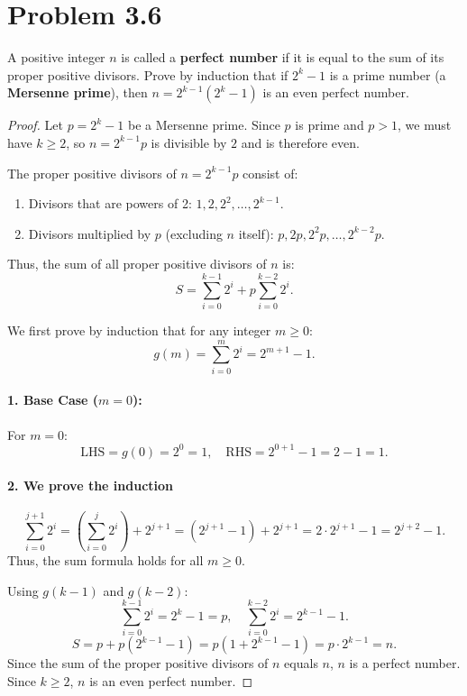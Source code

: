 \documentclass[12pt]{article}
\begin{document}
\section*{Problem 3.6}

A positive integer $n$ is called a \textbf{perfect number} if it is equal to the sum of its proper positive divisors.
Prove by induction that if $2^k - 1$ is a prime number (a \textbf{Mersenne prime}), then $n = 2^{k-1}(2^k - 1)$ is an even perfect number.

\begin{proof}
Let $p = 2^k - 1$ be a Mersenne prime. Since $p$ is prime and $p > 1$, we must have $k \ge 2$, so $n = 2^{k-1}p$ is divisible by $2$ and is therefore even.

The proper positive divisors of $n = 2^{k-1}p$ consist of:
\begin{enumerate}
    \item Divisors that are powers of 2: $1, 2, 2^2, \dots, 2^{k-1}$.
    \item Divisors multiplied by $p$ (excluding $n$ itself): $p, 2p, 2^2p, \dots, 2^{k-2}p$.
\end{enumerate}

Thus, the sum of all proper positive divisors of $n$ is:
\[
S = \sum_{i=0}^{k-1} 2^i + p \sum_{i=0}^{k-2} 2^i.
\]

We first prove by induction that for any integer $m \ge 0$:
\[
g(m) = \sum_{i=0}^{m} 2^i = 2^{m+1} - 1.
\]

\paragraph{1. Base Case ($m = 0$):}
For $m = 0$:
\[
\text{LHS} = g(0) = 2^0 = 1, \quad \text{RHS} = 2^{0+1} - 1 = 2 - 1 = 1.
\]

\paragraph{2. We prove the induction}
\[
\sum_{i=0}^{j+1} 2^i = \left(\sum_{i=0}^{j} 2^i\right) + 2^{j+1} = (2^{j+1} - 1) + 2^{j+1} = 2 \cdot 2^{j+1} - 1 = 2^{j+2} - 1.
\]
Thus, the sum formula holds for all $m \ge 0$.

Using $g(k-1)$ and $g(k-2)$:
\[
\sum_{i=0}^{k-1} 2^i = 2^k - 1 = p, \quad \sum_{i=0}^{k-2} 2^i = 2^{k-1} - 1.
\]
\[
S = p + p(2^{k-1} - 1) = p\left(1 + 2^{k-1} - 1\right) = p \cdot 2^{k-1} = n.
\]
Since the sum of the proper positive divisors of $n$ equals $n$, $n$ is a perfect number. Since $k \ge 2$, $n$ is an even perfect number.
\end{proof}
\end{document}
